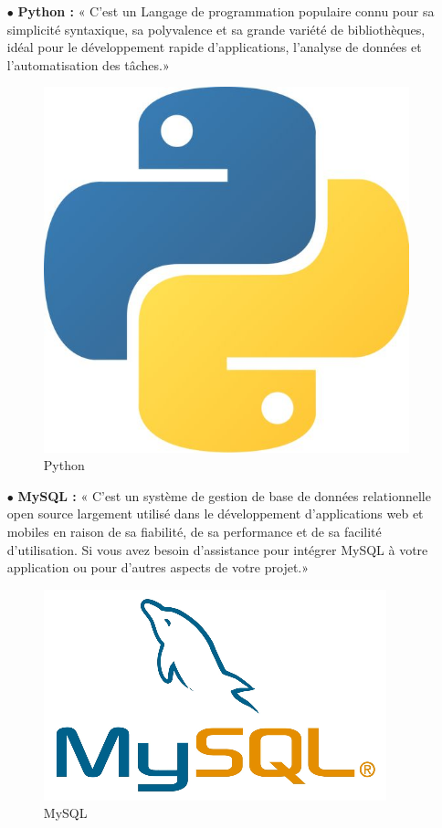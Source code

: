 \begin{itemize}
    \item[$\bullet$] \textbf{ Python :}
          « C'est un Langage de programmation populaire connu pour sa simplicité syntaxique, sa polyvalence et sa grande variété de bibliothèques, idéal pour le développement rapide d'applications, l'analyse de données et l'automatisation des tâches.»

          \begin{figure}[ht]
              \centering \includegraphics[scale=0.15]{chap1.images/python.jpg}
              \caption{Python}
              \label{PYTHON}
          \end{figure}



    \item[$\bullet$] \textbf{  MySQL :} « C'est un système de gestion de base de données relationnelle open source largement utilisé dans le développement d'applications web et mobiles en raison de sa fiabilité, de sa performance et de sa facilité d'utilisation. Si vous avez besoin d'assistance pour intégrer MySQL à votre application ou pour d'autres aspects de votre projet.»

          \begin{figure}[ht]
              \centering \includegraphics[scale=0.3]{chap1.images/MySQL.png}
              \caption{MySQL}
              \label{fig: MySQL}
          \end{figure}



\end{itemize}
